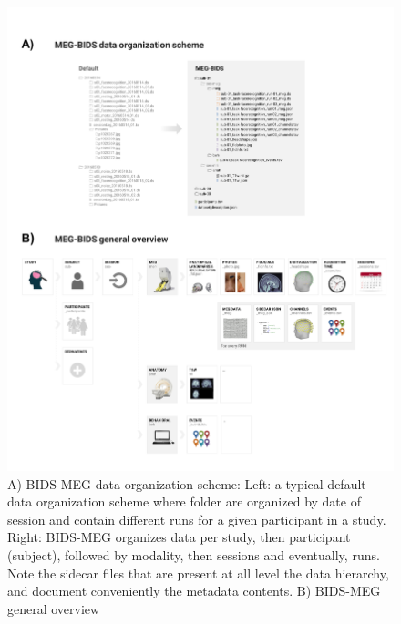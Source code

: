\begin{figure}[htb]
\begin{center}
   \includegraphics[width=0.95\linewidth]{figures/MEG-BIDS.png}
\end{center}
   \caption{ A) BIDS-MEG data organization scheme: Left: a typical default data organization scheme where folder are organized by date of session and contain different runs for a given participant in a study. Right: BIDS-MEG organizes data per study, then participant (subject), followed by modality, then sessions and eventually, runs. Note the sidecar files that are present at all level the data hierarchy, and document conveniently the metadata contents. B) BIDS-MEG general overview}
   \label{fig:clock_standards}
\end{figure}

\noindent{}%

